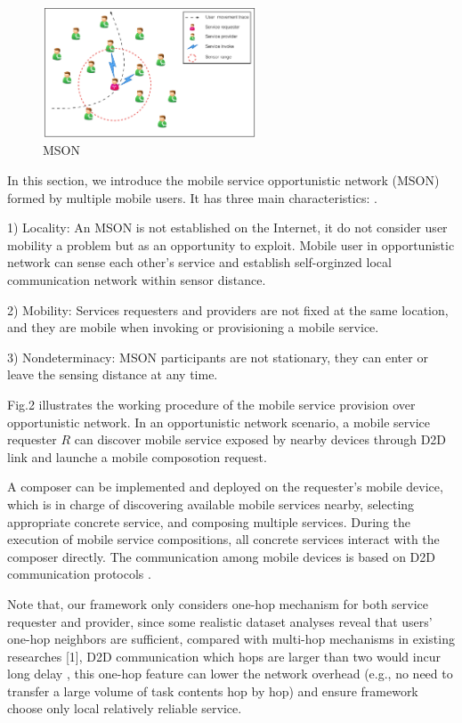 \documentclass[10pt,journal,compsoc]{IEEEtran}
\begin{document}
\begin{figure}[!t]
\centering
\includegraphics[width=2.5in]{./img/pic2.png}
\caption{MSON}
\label{fig_mson}
\end{figure}

In this section, we introduce the mobile service opportunistic network (MSON) formed by multiple mobile users. It has three main characteristics: \cite{Deng2017}.

1) Locality: An MSON is not established on the Internet, it do not consider user mobility a problem but as an opportunity to exploit. Mobile user in opportunistic network can sense each other's service and establish self-orginzed local communication network within sensor distance.

2) Mobility: Services requesters and providers are not fixed at the same location, and they are mobile when invoking or provisioning a mobile service.

3) Nondeterminacy: MSON participants are not stationary, they can enter or leave the sensing distance at any time. 



Fig.2 illustrates the working procedure of the mobile service provision over opportunistic network. In an opportunistic network scenario, a mobile service requester $R$ can discover mobile service exposed by nearby devices through D2D link and launche a mobile composotion request. 

A composer can be implemented and deployed on the requester’s mobile device, which is in charge of discovering available mobile services nearby, selecting appropriate concrete service, and composing multiple services. During the execution of mobile service compositions, all concrete services interact with the composer directly. The communication among mobile devices is based on D2D communication protocols \cite{Deng2017}.

Note that, our framework only considers one-hop mechanism for both service requester and provider, since some realistic dataset analyses reveal that users’ one-hop neighbors are sufficient, compared with multi-hop mechanisms in existing researches \cite{chang2015progressive,karaliopoulos2015user,han2016competition,tuncay2013participant,wu2013homing,jiang2016exploiting}[1]\cite{liu2013exploring}, D2D communication which hops are larger than two would incur long delay \cite{li2014can},  this one-hop feature can lower the network overhead (e.g., no need to transfer a large volume of task contents hop by hop) and ensure framework choose only local relatively reliable service. 
\end{document}
